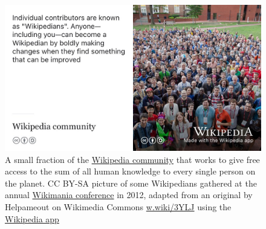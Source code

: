 \documentclass[
]{book}
\begin{document}
\begin{figure}

{\centering \includegraphics[width=0.99\linewidth]{images/wikipedians} 

}

\caption{A small fraction of the \href{https://en.wikipedia.org/wiki/Wikipedia_community}{Wikipedia community} that works to give free access to the sum of all human knowledge to every single person on the planet. CC BY-SA picture of some Wikipedians gathered at the annual \href{https://en.wikipedia.org/wiki/Wikimania}{Wikimania conference} in 2012, adapted from an original by Helpameout on Wikimedia Commons \href{https://w.wiki/3YLJ}{w.wiki/3YLJ} using the \href{https://apps.apple.com/us/app/wikipedia/id324715238}{Wikipedia app}}\label{fig:wikipedians-fig}
\end{figure}
\end{document}
